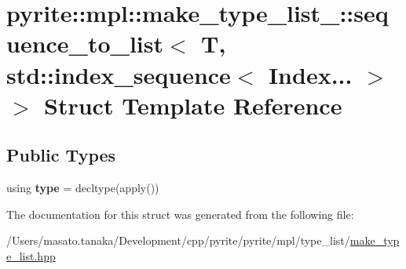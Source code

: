 \hypertarget{structpyrite_1_1mpl_1_1make__type__list___1_1sequence__to__list_3_01_t_00_01std_1_1index__sequence_3_01_index_8_8_8_01_4_01_4}{}\section{pyrite\+:\+:mpl\+:\+:make\+\_\+type\+\_\+list\+\_\+\+:\+:sequence\+\_\+to\+\_\+list$<$ T, std\+:\+:index\+\_\+sequence$<$ Index... $>$ $>$ Struct Template Reference}
\label{structpyrite_1_1mpl_1_1make__type__list___1_1sequence__to__list_3_01_t_00_01std_1_1index__sequence_3_01_index_8_8_8_01_4_01_4}
\subsection*{Public Types}
\begin{DoxyCompactItemize}
\item 
\mbox{\label{structpyrite_1_1mpl_1_1make__type__list___1_1sequence__to__list_3_01_t_00_01std_1_1index__sequence_3_01_index_8_8_8_01_4_01_4_a0a6a63ede5bdaed5db16c9dc034e4b7f}} 
using {\bfseries type} = decltype(apply())
\end{DoxyCompactItemize}


The documentation for this struct was generated from the following file\+:\begin{DoxyCompactItemize}
\item 
/\+Users/masato.\+tanaka/\+Development/cpp/pyrite/pyrite/mpl/type\+\_\+list/\mbox{\hyperlink{make__type__list_8hpp}{make\+\_\+type\+\_\+list.\+hpp}}\end{DoxyCompactItemize}
